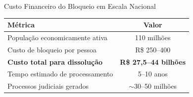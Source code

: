 \documentclass{libs/ufc_format}
\begin{document}
\begin{frame}{Custo Financeiro do Bloqueio em Escala Nacional}
    \begin{table}
        \centering
        \small
        \begin{tabular}{p{5.5cm}c}
            \toprule
            \textbf{Métrica} & \textbf{Valor} \\
            \midrule
            População economicamente ativa & 110 milhões \\
            Custo de bloqueio por pessoa & R\$ 250--400 \\
            \textbf{Custo total para dissolução} & \textbf{R\$ 27,5--44 bilhões} \\
            Tempo estimado de processamento & 5--10 anos \\
            Processos judiciais gerados & $\sim$30--50 milhões \\
            \bottomrule
        \end{tabular}
    \end{table}

    \vspace{0.3cm}

\end{frame}
\end{document}
